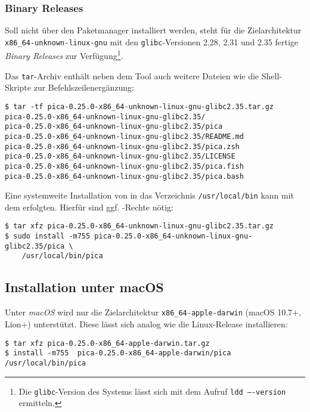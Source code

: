 \subsubsection{Binary Releases}

Soll \pica{} nicht über den Paketmanager installiert werden, steht für
die Zielarchitektur \texttt{x86_64-unknown-linux-gnu} mit den
\texttt{glibc}-Versionen 2.28, 2.31 und 2.35 fertige \emph{Binary
  Releases} zur Verfügung\footnote{Die \texttt{glibc}-Version des
  Systems lässt sich mit dem Aufruf \texttt{ldd ----version}
  ermitteln.}.

Das \texttt{tar}-Archiv enthält neben dem Tool \pica{} auch weitere
Dateien wie die Shell-Skripte zur Befehlszeilenergänzung:

\begin{verbatim}
$ tar -tf pica-0.25.0-x86_64-unknown-linux-gnu-glibc2.35.tar.gz
pica-0.25.0-x86_64-unknown-linux-gnu-glibc2.35/
pica-0.25.0-x86_64-unknown-linux-gnu-glibc2.35/pica
pica-0.25.0-x86_64-unknown-linux-gnu-glibc2.35/README.md
pica-0.25.0-x86_64-unknown-linux-gnu-glibc2.35/pica.zsh
pica-0.25.0-x86_64-unknown-linux-gnu-glibc2.35/LICENSE
pica-0.25.0-x86_64-unknown-linux-gnu-glibc2.35/pica.fish
pica-0.25.0-x86_64-unknown-linux-gnu-glibc2.35/pica.bash
\end{verbatim}

Eine systemweite Installation von \pica{} in das Verzeichnis
\texttt{/usr/local/bin} kann mit dem  erfolgten. Hierfür
sind ggf. -Rechte nötig:

\begin{verbatim}
$ tar xfz pica-0.25.0-x86_64-unknown-linux-gnu-glibc2.35.tar.gz
$ sudo install -m755 pica-0.25.0-x86_64-unknown-linux-gnu-glibc2.35/pica \
    /usr/local/bin/pica
\end{verbatim}

\subsection{Installation unter macOS}

Unter \textit{macOS} wird nur die Zielarchitektur
\texttt{x86_64-apple-darwin} (macOS 10.7+, Lion+) unterstützt. Diese
lässt sich analog wie die Linux-Release installieren:

\begin{verbatim}
$ tar xfz pica-0.25.0-x86_64-apple-darwin.tar.gz
$ install -m755  pica-0.25.0-x86_64-apple-darwin/pica /usr/local/bin/pica
\end{verbatim}


